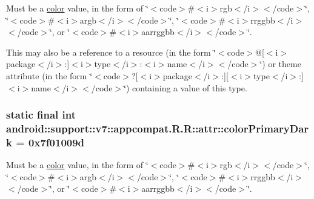 Must be a \hyperlink{classandroid_1_1support_1_1v7_1_1appcompat_1_1_r_1_1color}{color} value, in the form of \char`\"{}$<$code$>$\#$<$i$>$rgb$<$/i$>$$<$/code$>$\char`\"{}, \char`\"{}$<$code$>$\#$<$i$>$argb$<$/i$>$$<$/code$>$\char`\"{}, \char`\"{}$<$code$>$\#$<$i$>$rrggbb$<$/i$>$$<$/code$>$\char`\"{}, or \char`\"{}$<$code$>$\#$<$i$>$aarrggbb$<$/i$>$$<$/code$>$\char`\"{}. 

This may also be a reference to a resource (in the form \char`\"{}$<$code$>$@\mbox{[}$<$i$>$package$<$/i$>$:\mbox{]}$<$i$>$type$<$/i$>$:$<$i$>$name$<$/i$>$$<$/code$>$\char`\"{}) or theme attribute (in the form \char`\"{}$<$code$>$?\mbox{[}$<$i$>$package$<$/i$>$:\mbox{]}\mbox{[}$<$i$>$type$<$/i$>$:\mbox{]}$<$i$>$name$<$/i$>$$<$/code$>$\char`\"{}) containing a value of this type. \hypertarget{classandroid_1_1support_1_1v7_1_1appcompat_1_1_r_1_1attr_ac95916a09ab377adb70d7d3473f7197}{
\subsubsection[{colorPrimaryDark}]{\setlength{\rightskip}{0pt plus 5cm}static final int android::support::v7::appcompat.R.R::attr::colorPrimaryDark = 0x7f01009d}}
\label{classandroid_1_1support_1_1v7_1_1appcompat_1_1_r_1_1attr_ac95916a09ab377adb70d7d3473f7197}


Must be a \hyperlink{classandroid_1_1support_1_1v7_1_1appcompat_1_1_r_1_1color}{color} value, in the form of \char`\"{}$<$code$>$\#$<$i$>$rgb$<$/i$>$$<$/code$>$\char`\"{}, \char`\"{}$<$code$>$\#$<$i$>$argb$<$/i$>$$<$/code$>$\char`\"{}, \char`\"{}$<$code$>$\#$<$i$>$rrggbb$<$/i$>$$<$/code$>$\char`\"{}, or \char`\"{}$<$code$>$\#$<$i$>$aarrggbb$<$/i$>$$<$/code$>$\char`\"{}. 

